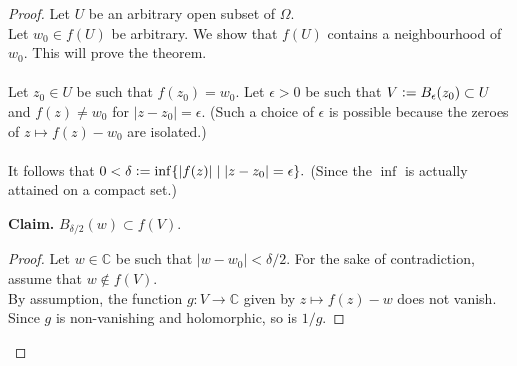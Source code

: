 \openmapping*\label{thm:openmapping2}
\begin{flushright}\hyperref[thm:openmapping]{\upsym}\end{flushright}
\begin{proof}
	Let $U$ be an arbitrary open subset of $\Omega.$\\
	Let $w_0 \in f(U)$ be arbitrary. We show that $f(U)$ contains a neighbourhood of $w_0.$ This will prove the theorem.\\~\\
	Let $z_0 \in U$ be such that $f(z_0) = w_0.$ Let $\epsilon > 0$ be such that $V \vcentcolon= B_\epsilon(z_0) \subset U$ and $f(z) \neq w_0$ for $|z - z_0| = \epsilon.$ (Such a choice of $\epsilon$ is possible because the zeroes of $z\mapsto f(z) - w_0$ are isolated.)\\~\\
	It follows that $0 < \delta \vcentcolon= \inf\{\left|f(z)\right| \mid |z - z_0| = \epsilon\}.$ (Since the $\inf$ is actually attained on a compact set.)\\
	\begin{blockquote}
	\textbf{Claim.} $B_{\delta/2}(w) \subset f(V).$
	\begin{proof} 
		Let $w \in \mathbb{C}$ be such that $\left|w - w_0\right| < \delta/2.$ For the sake of contradiction, assume that $w \notin f(V).$ \\
		By assumption, the function $g:V\to\mathbb{C}$ given by $z\mapsto f(z) - w$ does not vanish.\\
		Since $g$ is non-vanishing and holomorphic, so is $1/g.$


\end{proof}
\end{blockquote}
\end{proof}
